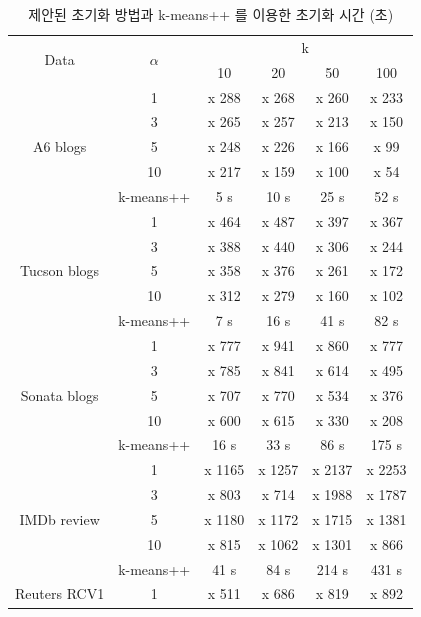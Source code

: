 \documentclass[oneside, ko,phd]{snuthesis_utf8_kor}
\begin{document}
\begin{table}[H]
\small
\centering
\caption{제안된 초기화 방법과 k-means++ 를 이용한 초기화 시간 (초)}
\label{tab:performance_initialization_time}
\renewcommand{\arraystretch}{.67}
\begin{tabular}{|c|c|c|c|c|c|}
\hline
\multirow{2}{*}{Data} & \multirow{2}{*}{$\alpha$} & \multicolumn{4}{c|}{k} \\ \cline{3-6} 
 &  & 10 & 20 & 50 & 100 \\ \hline
\multirow{5}{*}{A6 blogs} & 1 & x 288 & x 268 & x 260 & x 233 \\ \cline{2-6} 
 & 3 & x 265 & x 257 & x 213 & x 150 \\ \cline{2-6} 
 & 5 & x 248 & x 226 & x 166 & x 99 \\ \cline{2-6} 
 & 10 & x 217 & x 159 & x 100 & x 54 \\ \cline{2-6} 
 & k-means++ & 5 s & 10 s & 25 s & 52 s \\ \hline
\multirow{5}{*}{Tucson blogs} & 1 & x 464 & x 487 & x 397 & x 367 \\ \cline{2-6} 
 & 3 & x 388 & x 440 & x 306 & x 244 \\ \cline{2-6} 
 & 5 & x 358 & x 376 & x 261 & x 172 \\ \cline{2-6} 
 & 10 & x 312 & x 279 & x 160 & x 102 \\ \cline{2-6} 
 & k-means++ & 7 s & 16 s & 41 s & 82 s \\ \hline
\multirow{5}{*}{Sonata blogs} & 1 & x 777 & x 941 & x 860 & x 777 \\ \cline{2-6} 
 & 3 & x 785 & x 841 & x 614 & x 495 \\ \cline{2-6} 
 & 5 & x 707 & x 770 & x 534 & x 376 \\ \cline{2-6} 
 & 10 & x 600 & x 615 & x 330 & x 208 \\ \cline{2-6} 
 & k-means++ & 16 s & 33 s & 86 s & 175 s \\ \hline
\multirow{5}{*}{IMDb review} & 1 & x 1165 & x 1257 & x 2137 & x 2253 \\ \cline{2-6} 
 & 3 & x 803 & x 714 & x 1988 & x 1787 \\ \cline{2-6} 
 & 5 & x 1180 & x 1172 & x 1715 & x 1381 \\ \cline{2-6} 
 & 10 & x 815 & x 1062 & x 1301 & x 866 \\ \cline{2-6} 
 & k-means++ & 41 s & 84 s & 214 s & 431 s \\ \hline
\multirow{5}{*}{Reuters RCV1} & 1 & x 511 & x 686 & x 819 & x 892 \\ \cline{2-6} 

\end{tabular}
\end{table}
\end{document}
